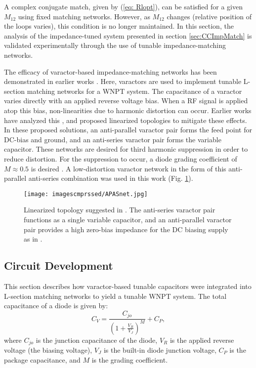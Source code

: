 \documentclass[journal]{IEEEtran}
\begin{document}
A complex conjugate match, given by (\ref{eq: Rlopt}), can be satisfied for a given $M_{12}$ using fixed matching networks. However, as $M_{12}$ changes (relative position of the loops varies), this condition is no longer maintained. In this section, the analysis of the impedance-tuned system presented in section \ref{sec:CCImpMatch} is validated experimentally through the use of tunable impedance-matching networks.

The efficacy of varactor-based impedance-matching networks has been demonstrated in earlier works \cite{VaracMatch, VaracAmps}. Here, varactors are used to implement tunable L-section matching networks for a WNPT system. The capacitance of a varactor varies directly with an applied reverse voltage bias. When a RF signal is applied atop this bias, non-linearities due to harmonic distortion can occur. Earlier works have analyzed this \cite{Meyer-Varacts,Buis1,Buis2}, and proposed linearized topologies to mitigate these effects. In these proposed solutions, an anti-parallel varactor pair forms the feed point for DC-bias and ground, and an anti-series varactor pair forms the variable capacitor. These networks are desired for third harmonic suppression in order to reduce distortion. For the suppression to occur, a diode grading coefficient of $M\approx0.5$ is desired \cite{Meyer-Varacts}. A low-distortion varactor network in the form of this anti-parallel anti-series combination was used in this work (Fig. \ref{fig:APASnet}).
\begin{figure}[htbp]
    \centering
    \texttt{[image: imagescmprssed/APASnet.jpg]}
    \caption{Linearized topology suggested in \cite{Buis1, Buis2}. The anti-series varactor pair functions as a single variable capacitor, and an anti-parallel varactor pair provides a high zero-bias impedance for the DC biasing supply as in \cite{Buis3}.}
    \label{fig:APASnet}
\end{figure}

\subsection{Circuit Development}

This section describes how varactor-based tunable capacitors were integrated into L-section matching networks to yield a tunable WNPT system. The total capacitance of a diode is given by:
\begin{equation}
    C_V = \frac{C_{jo}}{{\left(1+\frac{V_R}{V_J}\right)}^M}+C_P,
    \label{eq:CV}
\end{equation}
where $C_{jo}$ is the junction capacitance of the diode, $V_R$ is the applied reverse voltage (the biasing voltage), $V_J$ is the built-in diode junction voltage, $C_P$ is the package capacitance, and $M$ is the grading coefficient.
\end{document}
